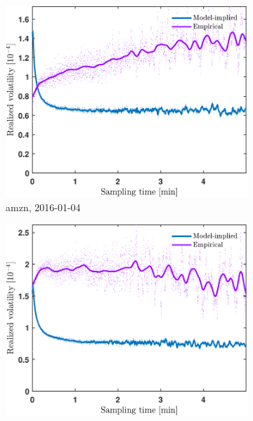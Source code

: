 \documentclass[11pt, a4paper]{thesis}  %
\begin{document}

\begin{figure}[H]
    \centering
    

    \begin{subfigure}[b]{0.3\textwidth}
        \centering
        \includegraphics[width=\textwidth]{./SignaturePlot/AMZN/20160104/signature_plot_predicted_vs_measured.pdf}
        \caption{\ac{amzn}, 2016-01-04}
        \label{figure:results:signature_plot:amzn:20160104}
    \end{subfigure}
    \hfill
    \begin{subfigure}[b]{0.3\textwidth}
        \centering
        \includegraphics[width=\textwidth]{./SignaturePlot/AMZN/20160115/signature_plot_predicted_vs_measured.pdf}

\end{subfigure}
\end{figure}
\end{document}
